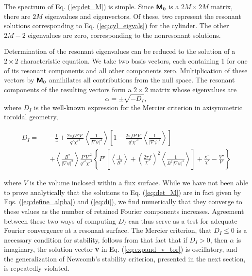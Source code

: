 \documentclass[prb,twocolumn,showpacs,preprintnumbers,amsmath,amssymb]{revtex4}
\renewcommand*{\v}[1]{\hbox{\bfseries #1}}
\renewcommand*{\t}[1]{\hbox{\sffamily\bfseries #1}}
\begin{document}
The spectrum of Eq. (\ref{eq:det_M}) is simple.  Since
$\t{M}_0$ is a $2M \times 2M$ matrix, there are $2M$ eigenvalues and
eigenvectors.  Of these, two represent the resonant solutions
corresponding to Eq. (\ref{eq:cyl_eigvals}) for the cylinder.  The other
$2M-2$ eigenvalues are zero, corresponding to the nonresonant solutions.

Determination of the resonant eigenvalues can be reduced to the solution
of a $2 \times 2$ characteristic equation.  We take two basis vectors,
each containing 1 for one of its resonant components and all other
components zero.  Multiplication of these vectors by $\t{M}_0$
annihilates all contributions from the null space.  The resonant
components of the resulting vectors form a $2 \times 2$ matrix whose
eigenvalues are
\begin{equation}
\alpha = \pm \sqrt{-D_I},
\label{eq:define_alpha}
\end{equation}
where $D_I$ is the well-known expression for the Mercier criterion in
axisymmetric toroidal geometry,\cite{jmg62,cm61,ahg75}
\begin{widetext}
\begin{eqnarray}
D_I =&& - \frac{1}{4} 
+ \frac{2 \pi f P' V'}{q' \chi'^3} 
	\left< \frac{1}{|\nabla \psi|^2} \right>
	\left[ 1 - \frac{2 \pi f P' V'}{q' \chi'^3}
	\left< \frac{1}{|\nabla \psi|^2} \right> \right] \nonumber \\
&&+ \left< \frac{B^2}{|\nabla \psi|^2} \right> 
	\frac{P' V'^2}{q'^2 \chi'^4}
	\left\{P' \left[ \left< \frac{1}{B^2} \right>
	+ \left( \frac{2 \pi f}{\chi'} \right)^2 
	\left< \frac{1}{B^2 |\nabla \psi|^2} \right> \right]
	+ \frac{\chi''}{\chi'} - \frac{V''}{V'} \right\}
\label{eq:di}
\end{eqnarray}
\end{widetext}
where $V$ is the volume inclosed within a flux surface.  While we have
not been able to prove analytically that the solutions to
Eq. (\ref{eq:det_M}) are in fact given by Eqs. (\ref{eq:define_alpha})
and (\ref{eq:di}), we find numerically that they converge to these
values as the number of retained Fourier components increases.
Agreement between these two ways of computing $D_I$ can thus serve as a
test for adequate Fourier convergence at a resonant surface.  The
Mercier criterion, that $D_I \le 0$ is a necessary condition for
stability, follows from that fact that if $D_I > 0$, then $\alpha$ is
imaginary, the solution vector \v{v} in Eq. (\ref{eq:expand_v_tor}) is
oscillatory, and the generalization of Newcomb's stability criterion,
presented in the next section, is repeatedly violated.
\end{document}
